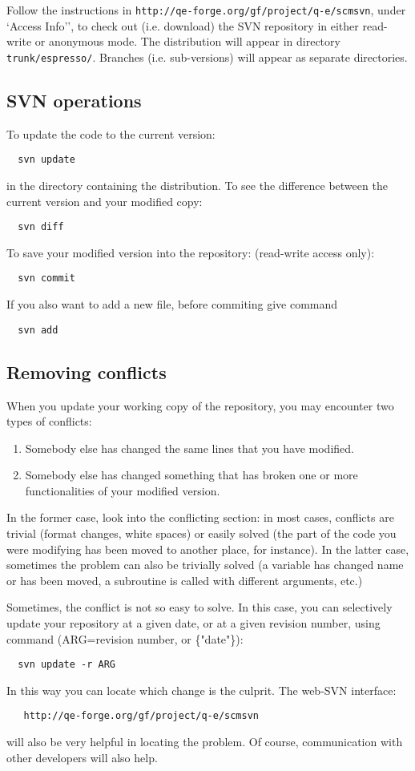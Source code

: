\documentclass[12pt,a4paper]{article}
\begin{document}
Follow the instructions in
\texttt{http://qe-forge.org/gf/project/q-e/scmsvn},
under `Access Info'',
to check out (i.e.  download) the SVN repository in either 
read-write or anonymous mode.
The distribution will appear in directory \texttt{trunk/espresso/}.
Branches (i.e. sub-versions) will appear as separate directories.

\subsection{SVN operations}

To update the code to the current version: 
\begin{verbatim}
  svn update
\end{verbatim}
in the directory containing the distribution.
To see the difference between the current version and your modified 
copy:
\begin{verbatim}
  svn diff
\end{verbatim}
To save your modified version into the repository:
(read-write access only):
\begin{verbatim}
  svn commit
\end{verbatim}
If you also want to add a new file, before commiting give command
\begin{verbatim}
  svn add
\end{verbatim}

\subsection{Removing conflicts}
\label{SubSec:Conflicts}
When you update your working copy of the repository, 
you may encounter two types of conflicts:
\begin{enumerate}
\item Somebody else has changed the same lines that you have
      modified. 
\item Somebody else has changed something that has broken one
      or more functionalities of your modified version.
\end{enumerate}
In the former case, look into the conflicting section: in most cases,
conflicts are trivial (format changes, white spaces) or easily solved 
(the part of the code you were modifying has been moved to another place,
for instance). In the latter case, sometimes the problem can also be
trivially solved (a variable has changed name or has been moved, a
subroutine is called with different arguments, etc.)

Sometimes, the conflict is not so easy to solve. In this case, you
can selectively update your repository at a given date, or at a given
revision number, using command (ARG=revision number, or \{"date"\}):
\begin{verbatim}
  svn update -r ARG
\end{verbatim}
In this way you can locate which change is the culprit.
The web-SVN interface:
\begin{verbatim}
   http://qe-forge.org/gf/project/q-e/scmsvn
\end{verbatim}
will also be very helpful in locating the problem.
Of course, communication with other developers will also help.
\end{document}
